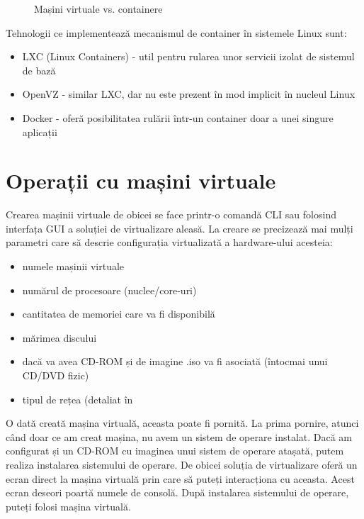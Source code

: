 \begin{figure}[htbp]
	\centering
	\def\svgwidth{\columnwidth}
	
	\caption{Mașini virtuale vs. containere}
	\label{fig:vm:vm-container}
\end{figure}

Tehnologii ce implementează mecanismul de container în sistemele Linux sunt:

\begin{itemize}
	\item LXC  (Linux Containers) - util pentru
		rularea unor servicii izolat de sistemul de bază
	\item OpenVZ - similar LXC, dar nu este prezent în mod implicit în
		nucleul Linux
	\item Docker - oferă posibilitatea rulării într-un container doar a unei
		singure aplicații
\end{itemize}

\section{Operații cu mașini virtuale}
\label{sec:vm:ops}

Crearea mașinii virtuale de obicei se face printr-o comandă CLI sau
folosind interfața GUI a soluției de virtualizare aleasă. La creare
se precizează mai mulți parametri care să descrie configurația
virtualizată a hardware-ului acesteia:

\begin{itemize}
	\item numele mașinii virtuale
	\item numărul de procesoare (nuclee/core-uri)
	\item cantitatea de memoriei care va fi disponibilă
	\item mărimea discului
	\item dacă va avea CD-ROM și de imagine .iso va fi asociată (întocmai
		unui CD/DVD fizic)
        \item tipul de rețea (detaliat în 
\end{itemize}

O dată creată mașina virtuală, aceasta poate fi pornită. La prima pornire,
atunci când doar ce am creat mașina, nu avem un sistem de operare instalat. Dacă
am configurat și un CD-ROM cu imaginea unui sistem de operare atașată, putem
realiza instalarea sistemului de operare. De obicei soluția de virtualizare
oferă un ecran direct la mașina virtuală prin care să puteți interacționa cu
aceasta. Acest ecran deseori poartă numele de consolă. După instalarea
sistemului de operare, puteți folosi mașina virtuală.

